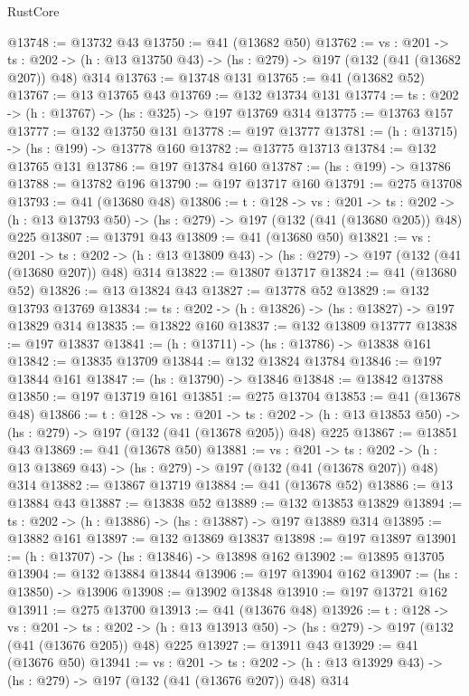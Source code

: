 \begin{lexlean}{RustCore}
\begin{coremodule}
@13748 := @13732 @43
@13750 := @41 (@13682 @50)
@13762 := {vs : @201} ->
  {ts : @202} -> (h : @13 @13750 @43) -> (hs : @279) -> @197 (@132 (@41 (@13682 @207)) @48) @314
@13763 := @13748 @131
@13765 := @41 (@13682 @52)
@13767 := @13 @13765 @43
@13769 := @132 @13734 @131
@13774 := {ts : @202} -> (h : @13767) -> (hs : @325) -> @197 @13769 @314
@13775 := @13763 @157
@13777 := @132 @13750 @131
@13778 := @197 @13777
@13781 := (h : @13715) -> (hs : @199) -> @13778 @160
@13782 := @13775 @13713
@13784 := @132 @13765 @131
@13786 := @197 @13784 @160
@13787 := (hs : @199) -> @13786
@13788 := @13782 @196
@13790 := @197 @13717 @160
@13791 := @275 @13708
@13793 := @41 (@13680 @48)
@13806 := {t : @128} ->
  {vs : @201} ->
  {ts : @202} -> (h : @13 @13793 @50) -> (hs : @279) -> @197 (@132 (@41 (@13680 @205)) @48) @225
@13807 := @13791 @43
@13809 := @41 (@13680 @50)
@13821 := {vs : @201} ->
  {ts : @202} -> (h : @13 @13809 @43) -> (hs : @279) -> @197 (@132 (@41 (@13680 @207)) @48) @314
@13822 := @13807 @13717
@13824 := @41 (@13680 @52)
@13826 := @13 @13824 @43
@13827 := @13778 @52
@13829 := @132 @13793 @13769
@13834 := {ts : @202} -> (h : @13826) -> (hs : @13827) -> @197 @13829 @314
@13835 := @13822 @160
@13837 := @132 @13809 @13777
@13838 := @197 @13837
@13841 := (h : @13711) -> (hs : @13786) -> @13838 @161
@13842 := @13835 @13709
@13844 := @132 @13824 @13784
@13846 := @197 @13844 @161
@13847 := (hs : @13790) -> @13846
@13848 := @13842 @13788
@13850 := @197 @13719 @161
@13851 := @275 @13704
@13853 := @41 (@13678 @48)
@13866 := {t : @128} ->
  {vs : @201} ->
  {ts : @202} -> (h : @13 @13853 @50) -> (hs : @279) -> @197 (@132 (@41 (@13678 @205)) @48) @225
@13867 := @13851 @43
@13869 := @41 (@13678 @50)
@13881 := {vs : @201} ->
  {ts : @202} -> (h : @13 @13869 @43) -> (hs : @279) -> @197 (@132 (@41 (@13678 @207)) @48) @314
@13882 := @13867 @13719
@13884 := @41 (@13678 @52)
@13886 := @13 @13884 @43
@13887 := @13838 @52
@13889 := @132 @13853 @13829
@13894 := {ts : @202} -> (h : @13886) -> (hs : @13887) -> @197 @13889 @314
@13895 := @13882 @161
@13897 := @132 @13869 @13837
@13898 := @197 @13897
@13901 := (h : @13707) -> (hs : @13846) -> @13898 @162
@13902 := @13895 @13705
@13904 := @132 @13884 @13844
@13906 := @197 @13904 @162
@13907 := (hs : @13850) -> @13906
@13908 := @13902 @13848
@13910 := @197 @13721 @162
@13911 := @275 @13700
@13913 := @41 (@13676 @48)
@13926 := {t : @128} ->
  {vs : @201} ->
  {ts : @202} -> (h : @13 @13913 @50) -> (hs : @279) -> @197 (@132 (@41 (@13676 @205)) @48) @225
@13927 := @13911 @43
@13929 := @41 (@13676 @50)
@13941 := {vs : @201} ->
  {ts : @202} -> (h : @13 @13929 @43) -> (hs : @279) -> @197 (@132 (@41 (@13676 @207)) @48) @314

\end{coremodule}
\end{lexlean}

